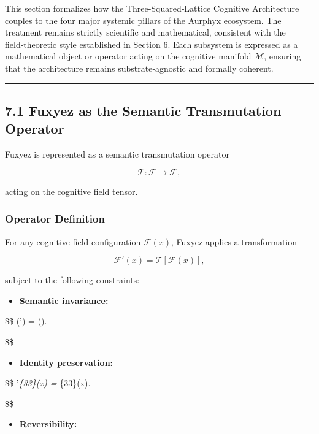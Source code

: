 This section formalizes how the Three‑Squared‑Lattice Cognitive Architecture couples to the four major systemic pillars of the Aurphyx ecosystem. The treatment remains strictly scientific and mathematical, consistent with the field‑theoretic style established in Section 6. Each subsystem is expressed as a mathematical object or operator acting on the cognitive manifold \(\mathcal{M}\), ensuring that the architecture remains substrate‑agnostic and formally coherent.

\begin{center}\rule{0.5\linewidth}{0.5pt}\end{center}

\subsection{7.1 Fuxyez as the Semantic Transmutation Operator}\label{fuxyez-as-the-semantic-transmutation-operator}

Fuxyez is represented as a semantic transmutation operator

\[
\mathcal{T} : \mathcal{F} \rightarrow \mathcal{F},
\]

acting on the cognitive field tensor.

\subsubsection{Operator Definition}\label{operator-definition}

For any cognitive field configuration \(\mathcal{F}(x)\), Fuxyez applies a transformation

\[
\mathcal{F}'(x) = \mathcal{T}[\mathcal{F}(x)],
\]

subject to the following constraints:

\begin{itemize}
\tightlist
\item
  \textbf{Semantic invariance:}
\end{itemize}

\$\$ \det(') = \det().

\$\$

\begin{itemize}
\tightlist
\item
  \textbf{Identity preservation:}
\end{itemize}

\$\$ \Phi'\emph{\{33\}(x) = \Phi}\{33\}(x).

\$\$

\begin{itemize}
\tightlist
\item
  \textbf{Reversibility:}
\end{itemize}

